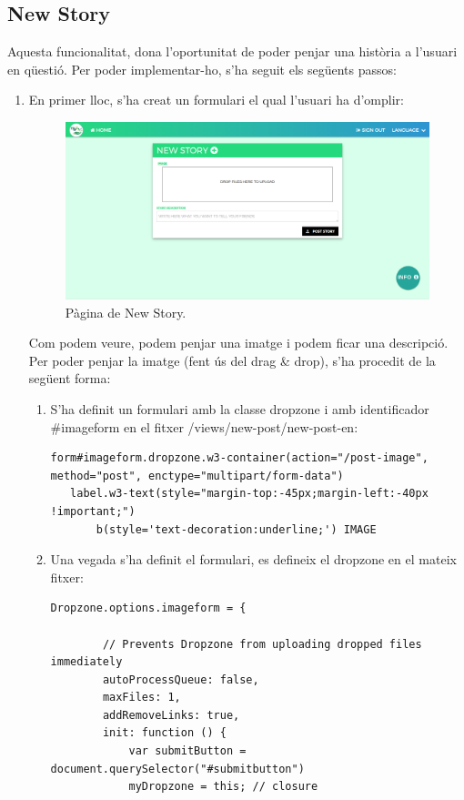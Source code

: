 \documentclass[11pt,catalan,listoffigures,listoftables]{tfgetsinf}
\begin{document}
\subsection{New Story}
Aquesta funcionalitat, dona l'oportunitat de poder penjar una història a l'usuari en qüestió. Per poder implementar-ho, s'ha seguit els següents passos:
\newpage
\begin{enumerate}
\item En primer lloc, s'ha creat un formulari el qual l'usuari ha d'omplir:
\begin{figure}[h]
\includegraphics[width=15cm]{images/image14}
\centering
\caption[Figura 4.9]{Pàgina de New Story.}
\centering
\end{figure}
Com podem veure, podem penjar una imatge i podem ficar una descripció. Per poder penjar la imatge (fent ús del drag \& drop), s'ha procedit de la següent forma:
\begin{enumerate}
\item S'ha definit un formulari amb la classe dropzone i amb identificador \#imageform en el fitxer /views/new-post/new-post-en:
\begin{lstlisting}
form#imageform.dropzone.w3-container(action="/post-image", method="post", enctype="multipart/form-data")
   label.w3-text(style="margin-top:-45px;margin-left:-40px !important;")
       b(style='text-decoration:underline;') IMAGE
\end{lstlisting}
\item Una vegada s'ha definit el formulari, es defineix el dropzone en el mateix fitxer:
\begin{lstlisting}
Dropzone.options.imageform = {

        // Prevents Dropzone from uploading dropped files immediately
        autoProcessQueue: false,
        maxFiles: 1,
        addRemoveLinks: true,
        init: function () {
            var submitButton = document.querySelector("#submitbutton")
            myDropzone = this; // closure


\end{lstlisting}
\end{enumerate}
\end{enumerate}
\end{document}
